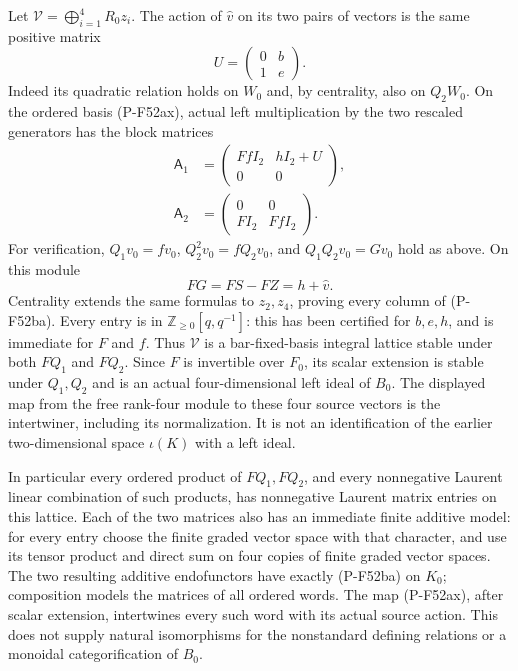 \documentclass[11pt,a4paper]{article}
\begin{document}
Let $\mathcal V=\bigoplus_{i=1}^4R_0z_i$.
The action of $\widehat v$ on its two pairs of vectors is
the same positive matrix
\[
             U=\begin{pmatrix}0&b\\1&e\end{pmatrix}.
                                                               \tag{P-F52az}
\]
Indeed its quadratic relation holds on $W_0$ and, by
centrality, also on $Q_2W_0$.
On the ordered basis (P-F52ax), actual left multiplication
by the two rescaled generators has the block matrices
\[
 \begin{split}
    \mathsf A_1&=
       \begin{pmatrix}FfI_2&hI_2+U\\0&0\end{pmatrix},\\
    \mathsf A_2&=
       \begin{pmatrix}0&0\\FI_2&FfI_2\end{pmatrix}.
 \end{split}                                                    \tag{P-F52ba}
\]
For verification, $Q_1v_0=fv_0$, $Q_2^2v_0=fQ_2v_0$,
and $Q_1Q_2v_0=Gv_0$ hold as above.
On this module
\[
                 FG=FS-FZ=h+\widehat v.
                                                               \tag{P-F52bb}
\]
Centrality extends the same formulas to $z_2,z_4$,
proving every column of (P-F52ba).
Every entry is in $\mathbb Z_{\ge0}[q,q^{-1}]$:
this has been certified for $b,e,h$, and is immediate
for $F$ and $f$. Thus $\mathcal V$ is a bar-fixed-basis
integral lattice stable under both $FQ_1$ and $FQ_2$.
Since $F$ is invertible over $F_0$, its scalar extension
is stable under $Q_1,Q_2$ and is an actual four-dimensional
left ideal of $B_0$. The displayed map from the free
rank-four module to these four source vectors is the
intertwiner, including its normalization. It is not an
identification of the earlier two-dimensional space
$\iota(K)$ with a left ideal.

In particular every ordered product of $FQ_1,FQ_2$, and
every nonnegative Laurent linear combination of such
products, has nonnegative Laurent matrix entries on this
lattice. Each of the two matrices also has an immediate
finite additive model: for every entry choose the finite
graded vector space with that character, and use its
tensor product and direct sum on four copies of finite
graded vector spaces. The two resulting additive
endofunctors have exactly (P-F52ba) on $K_0$; composition
models the matrices of all ordered words. The map
(P-F52ax), after scalar extension, intertwines every such
word with its actual source action. This does not supply
natural isomorphisms for the nonstandard defining
relations or a monoidal categorification of $B_0$.
\end{document}
